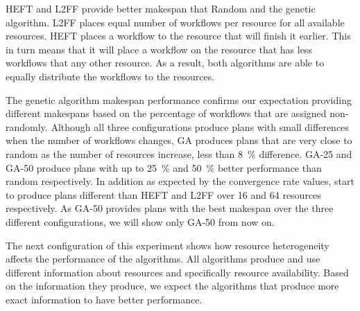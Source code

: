 HEFT and L2FF provide better makespan that Random and the genetic algorithm.
L2FF places equal number of workflows per resource for all available resources.
HEFT places a workflow to the resource that will finish it earlier.
This in turn means that it will place a workflow on the resource that has less workflows that any other resource.
As a result, both algorithms are able to equally distribute the workflows to the resources.

The genetic algorithm makespan performance confirms our expectation providing different makespans based on the percentage of workflows that are assigned non-randomly.
Although all three configurations produce plans with small differences when the number of workflows changes, GA produces plans that are very close to random as the number of resources increase, less than 8~\% difference.
GA-25 and GA-50 produce plans with up to 25~\% and 50~\% better performance than random respectively.
In addition as expected by the convergence rate values, start to produce plans different than HEFT and L2FF over 16 and 64 resources respectively.
As GA-50 provides plans with the best makespan over the three different configurations, we will show only GA-50 from now on.

The next configuration of this experiment shows how resource heterogeneity affects the performance of the algorithms.
All algorithms produce and use different information about resources and specifically resource availability.
Based on the information they produce, we expect the algorithms that produce more exact information to have better performance.

